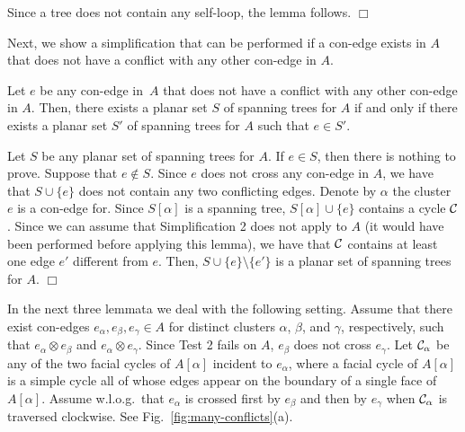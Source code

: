 \documentclass[letter,runningheads]{llncs}
\renewenvironment{proof}
{{\em Proof.\ }}{\hspace*{\fill}$\Box$\par\vspace{2mm}}
\newcommand{\conf}{\otimes}
\begin{document}
\begin{proof}
Since a tree does not contain any self-loop, the lemma follows.
\end{proof}


Next, we show a simplification that can be performed if a con-edge exists in $A$ that does not have a conflict with any other con-edge in $A$.
\begin{lemma}[{\sc Simplification 3}]\label{le:non-conf}
Let $e$ be any con-edge in~$A$ that does not have a conflict with any other con-edge in $A$. Then, there exists a planar set $S$ of spanning trees for $A$ if and only if there exists a planar set $S'$ of spanning trees for $A$ such that $e\in S'$.
\end{lemma}

\begin{proof}
Let $S$ be any planar set of spanning trees for $A$. If $e\in S$, then there is nothing to prove. Suppose that $e\notin S$. Since $e$ does not cross any con-edge in $A$, we have that $S\cup \{e\}$ does not contain any two conflicting edges. Denote by $\alpha$ the cluster $e$ is a con-edge for. Since $S[\alpha]$ is a spanning tree, $S[\alpha]\cup \{e\}$ contains a cycle $\cal C$. Since we can assume that {\sc Simplification 2} does not apply to $A$ (it would have been performed before applying this lemma), we have that $\cal C$ contains at least one edge $e'$ different from $e$. Then, $S\cup\{e\}\setminus\{e'\}$ is a planar set of spanning trees for $A$. \end{proof}

In the next three lemmata we deal with the following setting. Assume that there exist con-edges $e_{\alpha}, e_{\beta}, e_{\gamma}\in A$ for distinct clusters $\alpha$, $\beta$, and $\gamma$, respectively, such that $e_{\alpha}\conf e_{\beta}$ and $e_{\alpha} \conf e_{\gamma}$. Since {\sc Test 2} fails on $A$, $e_{\beta}$ does not cross $e_{\gamma}$. Let ${\cal C}_{\alpha}$ be any of the two facial cycles of $A[\alpha]$ incident to $e_{\alpha}$, where a facial cycle of  $A[\alpha]$ is a simple cycle all of whose edges appear on the boundary of a single face of $A[\alpha]$.  Assume w.l.o.g.\ that $e_{\alpha}$ is crossed first by $e_{\beta}$ and then by $e_{\gamma}$ when ${\cal C}_{\alpha}$ is traversed clockwise.  See Fig.~\ref{fig:many-conflicts}(a).
\end{document}
